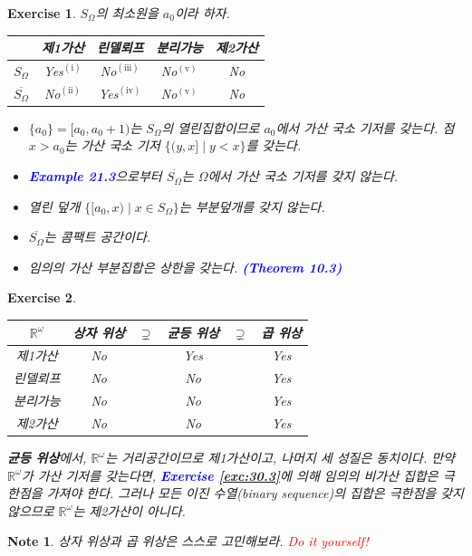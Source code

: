 \documentclass{article}
\newtheorem{exercise}{Exercise}[section]
\newtheorem*{note}{Note}
\newcommand{\R}{\mathbb{R}}
\begin{document}
\begin{exercise}
    $S_\Omega$의 최소원을 $a_0$이라 하자.
    \begin{table}[H]
    	\centering
        \begin{tabular}{c|cccc}
            \toprule
            & 제1가산 & 린델뢰프 & 분리가능 & 제2가산  \\
            \midrule
            $S_\Omega$ & Yes$^{(\text{i})}$ & No$^{(\text{iii})}$ & No$^{(\text{v})}$ & No \\
            \midrule
            $\overline{S_\Omega}$ & No$^{(\text{ii})}$ & Yes$^{(\text{iv})}$ & No$^{(\text{v})}$ & No \\ 
            \bottomrule
        \end{tabular}
    \end{table}
    \begin{itemize}
        \item[(i)] $\{a_0\}=[a_0,a_0+1)$는 $S_\Omega$의 열린집합이므로 $a_0$에서 가산 국소 기저를 갖는다. 점 $x>a_0$는 가산 국소 기저 $\{(y,x]\mid y<x\}$를 갖는다.
        \item[(ii)] \textcolor{blue}{\textbf{Example 21.3}}으로부터 $\overline{S_\Omega}$는 $\Omega$에서 가산 국소 기저를 갖지 않는다.
        \item[(iii)] 열린 덮개 $\{[a_0,x)\mid x\in S_\Omega\}$는 부분덮개를 갖지 않는다.
        \item[(iv)] $\overline{S_\Omega}$는 콤팩트 공간이다.
        \item[(v)] 임의의 가산 부분집합은 상한을 갖는다. \textcolor{blue}{\textbf{(Theorem 10.3)}}
    \end{itemize}
\end{exercise}

\begin{exercise}
    \phantom{}
    \begin{center}
        \begin{tabular}{|c||ccccc|}
            \hline
            $\R^\omega$ & 상자 위상 & $\supsetneq$ & 균등 위상 & $\supsetneq$ & 곱 위상 \\ \hline\hline
            제1가산 & No && Yes && Yes \\ \hline
            린델뢰프 & No && No && Yes \\ \hline
            분리가능 & No && No && Yes \\ \hline
            제2가산 & No && No && Yes \\ \hline
        \end{tabular}
    \end{center}
    \textbf{균등 위상}에서, $\R^\omega$는 거리공간이므로 제1가산이고, 나머지 세 성질은 동치이다. 만약 $\R^\omega$가 가산 기저를 갖는다면, \textcolor{blue}{\textbf{Exercise \ref{exc:30.3}}}에 의해 임의의 비가산 집합은 극한점을 가져야 한다. 그러나 모든 이진 수열(binary sequence)의 집합은 극한점을 갖지 않으므로 $\R^\omega$는 제2가산이 아니다.
\end{exercise}
\begin{note}
    상자 위상과 곱 위상은 스스로 고민해보라. \textcolor{red}{Do it yourself!}
\end{note}
\end{document}

